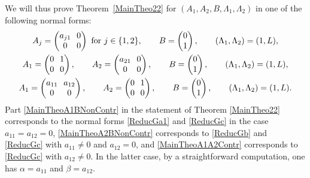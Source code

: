 \begin{remk}
We will thus prove Theorem~\ref{MainTheo22} for $(A_1, A_2, B, \Lambda_1, \Lambda_2) $ in one of the following normal forms:
\begin{gather}
\label{ReducGa1}\arraycolsep3.5pt
A_j = \begin{pmatrix}
a_{j1} & 0 \\
0 & 0 \\
\end{pmatrix} \text{ for } j \in \{1, 2\}, \qquad B = \begin{pmatrix}
0 \\
1 \\
\end{pmatrix}, \qquad (\Lambda_1, \Lambda_2) = (1, L),
\\
\label{ReducGb}\arraycolsep3.5pt
A_1 = \begin{pmatrix}
0 & 1 \\
0 & 0 \\
\end{pmatrix}, \qquad A_2 = \begin{pmatrix}
a_{21} & 0 \\
0 & 0 \\
\end{pmatrix}, \qquad B = \begin{pmatrix}
0 \\
1 \\
\end{pmatrix}, \qquad (\Lambda_1, \Lambda_2) = (1, L),
\\
\label{ReducGc}\arraycolsep3.5pt
A_1 = \begin{pmatrix}
a_{11} & a_{12} \\
0 & 0 \\
\end{pmatrix}, \qquad A_2 = \begin{pmatrix}
0 & 1 \\
0 & 0 \\
\end{pmatrix}, \qquad B = \begin{pmatrix}
0 \\
1 \\
\end{pmatrix}, \qquad (\Lambda_1, \Lambda_2) = (1, L).
\end{gather}
Part \eqref{MainTheoA1BNonContr} in the statement of Theorem \ref{MainTheo22} corresponds to the normal forms \eqref{ReducGa1} and \eqref{ReducGc} in the case $a_{11} = a_{12} = 0$, \eqref{MainTheoA2BNonContr} corresponds to \eqref{ReducGb} and \eqref{ReducGc} with $a_{11} \neq 0$ and $a_{12} = 0$, and \eqref{MainTheoA1A2Contr} corresponds to \eqref{ReducGc} with $a_{12} \neq 0$. In the latter case, by a straightforward computation, one has $\alpha = a_{11}$ and $\beta = a_{12}$.
\end{remk}


